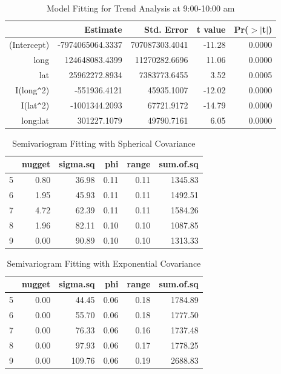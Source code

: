 \documentclass[hidelinks,12pt]{article}
\begin{document}
	\begin{table}[!ht]
		\centering
		\caption{Model Fitting for Trend Analysis at 9:00-10:00 am \label{tbl:trend9}}
		\begin{tabular}{rrrrr}
			\hline
			& Estimate & Std. Error & t value & Pr($>$$|$t$|$) \\ 
			\hline
			(Intercept) & -7974065064.3337 & 707087303.4041 & -11.28 & 0.0000 \\ 
			long & 124648083.4399 & 11270282.6696 & 11.06 & 0.0000 \\ 
			lat & 25962272.8934 & 7383773.6455 & 3.52 & 0.0005 \\ 
			I(long\verb|^|2) & -551936.4121 & 45935.1007 & -12.02 & 0.0000 \\ 
			I(lat\verb|^|2) & -1001344.2093 & 67721.9172 & -14.79 & 0.0000 \\ 
			long:lat & 301227.1079 & 49790.7161 & 6.05 & 0.0000 \\ 
			\hline
		\end{tabular}
	\end{table}
	\begin{table}[!ht]
		\centering
		\caption{Semivariogram Fitting with Spherical Covariance \label{semsph}}
		\begin{tabular}{rrrrrr}
			\hline
			& nugget & sigma.sq & phi & range & sum.of.sq \\ 
			\hline
			5 & 0.80 & 36.98 & 0.11 & 0.11 & 1345.83 \\ 
			6 & 1.95 & 45.93 & 0.11 & 0.11 & 1492.51 \\ 
			7 & 4.72 & 62.39 & 0.11 & 0.11 & 1584.26 \\ 
			8 & 1.96 & 82.11 & 0.10 & 0.10 & 1087.85 \\ 
			9 & 0.00 & 90.89 & 0.10 & 0.10 & 1313.33 \\ 
			\hline
		\end{tabular}
	\end{table}
	\begin{table}[!ht]
		\centering
		\caption{Semivariogram Fitting with Exponential Covariance \label{semexp}}
		\begin{tabular}{rrrrrr}
			\hline
			& nugget & sigma.sq & phi & range & sum.of.sq \\ 
			\hline
			5 & 0.00 & 44.45 & 0.06 & 0.18 & 1784.89 \\ 
			6 & 0.00 & 55.70 & 0.06 & 0.18 & 1777.50 \\ 
			7 & 0.00 & 76.33 & 0.06 & 0.16 & 1737.48 \\ 
			8 & 0.00 & 97.93 & 0.06 & 0.17 & 1778.25 \\ 
			9 & 0.00 & 109.76 & 0.06 & 0.19 & 2688.83 \\ 
			\hline
		\end{tabular}
	\end{table}
\end{document}
